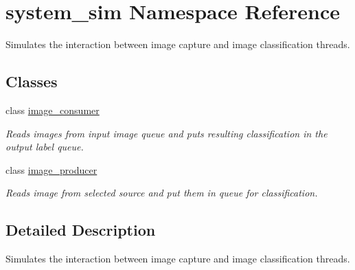 \hypertarget{namespacesystem__sim}{}\section{system\+\_\+sim Namespace Reference}
\label{namespacesystem__sim}


Simulates the interaction between image capture and image classification threads.  


\subsection*{Classes}
\begin{DoxyCompactItemize}
\item 
class \mbox{\hyperlink{classsystem__sim_1_1image__consumer}{image\+\_\+consumer}}
\begin{DoxyCompactList}\small\item\em Reads images from input image queue and puts resulting classification in the output label queue. \end{DoxyCompactList}\item 
class \mbox{\hyperlink{classsystem__sim_1_1image__producer}{image\+\_\+producer}}
\begin{DoxyCompactList}\small\item\em Reads image from selected source and put them in queue for classification. \end{DoxyCompactList}\end{DoxyCompactItemize}


\subsection{Detailed Description}
Simulates the interaction between image capture and image classification threads. 

